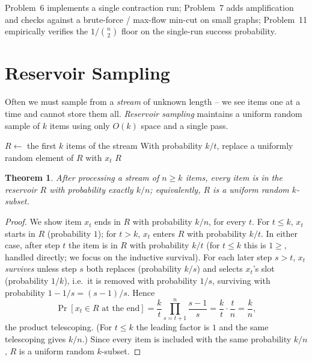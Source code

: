 \documentclass[11pt]{article}
\newtheorem{theorem}{Theorem}[section]
\begin{document}
Problem~6 implements a single contraction run; Problem~7 adds amplification and
checks against a brute-force / max-flow min-cut on small graphs; Problem~11
empirically verifies the $1/\binom{n}{2}$ floor on the single-run success
probability.

\section{Reservoir Sampling}

Often we must sample from a \emph{stream} of unknown length -- we see items one at
a time and cannot store them all. \emph{Reservoir sampling} maintains a uniform
random sample of $k$ items using only $O(k)$ space and a single pass.

\begin{algorithm}[h]
\caption{Reservoir Sampling (sample $k$ of an $n$-item stream)}
\begin{algorithmic}[1]
\State $R \gets$ the first $k$ items of the stream
    \State With probability $k/t$, replace a uniformly random element of $R$ with $x_t$
\EndFor
\State \Return $R$
\end{algorithmic}
\end{algorithm}

\begin{theorem}
\label{thm:reservoir}
After processing a stream of $n \ge k$ items, every item is in the reservoir $R$
with probability exactly $k/n$; equivalently, $R$ is a uniform random $k$-subset.
\end{theorem}

\begin{proof}
We show item $x_t$ ends in $R$ with probability $k/n$, for every $t$. For $t \le
k$, $x_t$ starts in $R$ (probability $1$); for $t > k$, $x_t$ enters $R$ with
probability $k/t$. In either case, after step $t$ the item is in $R$ with
probability $k/t$ (for $t \le k$ this is $1 \ge$, handled directly; we focus on the
inductive survival). For each later step $s > t$, $x_t$ \emph{survives} unless step
$s$ both replaces (probability $k/s$) and selects $x_t$'s slot (probability
$1/k$), i.e.\ it is removed with probability $1/s$, surviving with probability
$1 - 1/s = (s-1)/s$. Hence
\[
    \Pr[x_t \in R \text{ at the end}] = \frac{k}{t}\prod_{s=t+1}^{n}\frac{s-1}{s}
    = \frac{k}{t}\cdot\frac{t}{n} = \frac{k}{n},
\]
the product telescoping. (For $t \le k$ the leading factor is $1$ and the same
telescoping gives $k/n$.) Since every item is included with the same probability
$k/n$, $R$ is a uniform random $k$-subset.
\end{proof}
\end{document}
